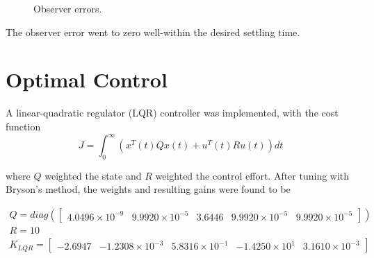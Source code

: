 \documentclass[]{aiaa-tc}%
\begin{document}
	\begin{figure}[H]
		\centering
		\caption{Observer errors. }
		\label{fig:Controller1ObsErrors}
	\end{figure}	

	The observer error went to zero well-within the desired settling time.

	\section{Optimal Control}

	A linear-quadratic regulator (LQR) controller was implemented, with the cost function
\begin{equation}
J=\int_{0}^{\infty}\left ( x^T(t)Qx(t)+u^T(t)Ru(t) \right )dt
\end{equation}

\noindent
where $Q$ weighted the state and $R$ weighted the control effort. After tuning with Bryson's method, the weights and resulting gains were found to be

	\vspace{5 mm}

{\centering
 $\begin{matrix}
Q=diag(\begin{bmatrix}
4.0496\times10^{-9} & 9.9920\times10^{-5} & 3.6446 & 9.9920\times10^{-5} & 9.9920\times10^{-5}
\end{bmatrix})\\ 
R = 10\\ 

K_{LQR}=\begin{bmatrix}
-2.6947 & -1.2308\times10^{-3} & 5.8316\times10^{-1} & -1.4250\times10^{1} & 3.1610\times10^{-3}\end{bmatrix}\\

\end{matrix}$\par
}
\end{document}
